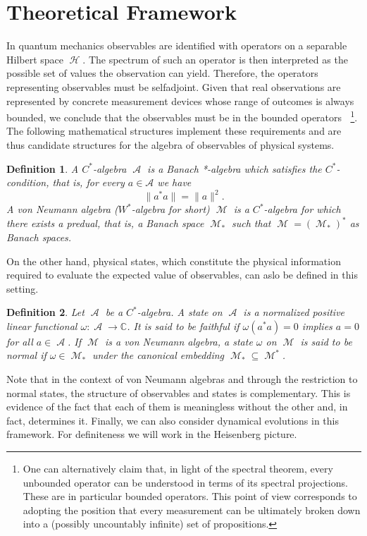 \documentclass{article}
\DeclareMathOperator{\M}{\mathcal{M}}
\DeclareMathOperator{\A}{\mathcal{A}}
\DeclareMathOperator{\h}{\mathcal{H}}
\DeclareMathOperator{\BH}{\mathcal{B}(\h)}
\newtheorem{definition}{Definition}[section]
\begin{document}
\section{Theoretical Framework}\label{sec:theory}

In quantum mechanics observables are identified with operators on a separable Hilbert space $\h$. The spectrum of such an operator is then interpreted as the possible set of values the observation can yield. Therefore, the operators representing observables must be selfadjoint. Given that real observations are represented by concrete measurement devices whose range of outcomes is always bounded, we conclude that the observables must be in the bounded operators $\BH$\footnote{One can alternatively claim that, in light of the spectral theorem\cite{Hall2013}, every unbounded operator can be understood in terms of its spectral projections. These are in particular bounded operators. This point of view corresponds to adopting the position that every measurement can be ultimately broken down into a (possibly uncountably infinite) set of propositions.}. The following mathematical structures implement these requirements and are thus candidate structures for the algebra of observables of physical systems.    
\begin{definition}
	A $C^*$-algebra $\A$ is a Banach *-algebra which satisfies the $C^*$-condition, that is, for every $a\in\mathcal{A}$ we have
	\begin{equation}
		\|a^*a\|=\|a\|^2.
	\end{equation}
	A von Neumann algebra ($W^*$-algebra for short) $\M$ is a $C^*$-algebra for which there exists a predual, that is, a Banach space $\M_*$ such that $\M=(\M_*)^*$ as Banach spaces.
\end{definition}
On the other hand, physical states, which constitute the physical information required to evaluate the expected value of observables, can aslo be defined in this setting.
\begin{definition}
	Let $\A$ be a $C^*$-algebra. A state on $\A$ is a normalized positive linear functional $\omega:\A\rightarrow\mathbb{C}$. It is said to be faithful if $\omega(a^*a)=0$ implies $a=0$ for all $a\in\A$. If $\M$ is a von Neumann algebra, a state $\omega$ on $\M$ is said to be normal if $\omega\in\M_*$ under the canonical embedding $\M_*\subseteq\M^*$.
\end{definition}
Note that in the context of von Neumann algebras and through the restriction to normal states, the structure of observables and states is complementary. This is evidence of the fact that each of them is meaningless without the other and, in fact, determines it. Finally, we can also consider dynamical evolutions in this framework. For definiteness we will work in the Heisenberg picture.
\end{document}
